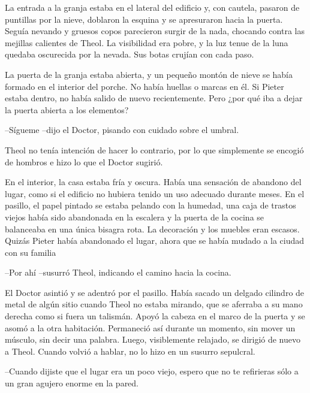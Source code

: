 La entrada a la granja estaba en el lateral del edificio y, con cautela, pasaron de puntillas por la nieve, doblaron la esquina y se apresuraron hacia la puerta. Seguía nevando y gruesos copos parecieron surgir de la nada, chocando contra las mejillas calientes de Theol. La visibilidad era pobre, y la luz tenue de la luna quedaba oscurecida por la nevada. Sus botas crujían con cada paso.



La puerta de la granja estaba abierta, y un pequeño montón de nieve se había formado en el interior del porche. No había huellas o marcas en él. Si Pieter estaba dentro, no había salido de nuevo recientemente. Pero ¿por qué iba a dejar la puerta abierta a los elementos?



--Sígueme --dijo el Doctor, pisando con cuidado sobre el umbral.



Theol no tenía intención de hacer lo contrario, por lo que simplemente se encogió de hombros e hizo lo que el Doctor sugirió.



En el interior, la casa estaba fría y oscura. Había una sensación de abandono del lugar, como si el edificio no hubiera tenido un uso adecuado durante meses. En el pasillo, el papel pintado se estaba pelando con la humedad, una caja de trastos viejos había sido abandonada en la escalera y la puerta de la cocina se balanceaba en una única bisagra rota. La decoración y los muebles eran escasos. Quizás Pieter había abandonado el lugar, ahora que se había mudado a la ciudad con su familia



--Por ahí --susurró Theol, indicando el camino hacia la cocina.



El Doctor asintió y se adentró por el pasillo. Había sacado un delgado cilindro de metal de algún sitio cuando Theol no estaba mirando, que se aferraba a su mano derecha como si fuera un talismán. Apoyó la cabeza en el marco de la puerta y se asomó a la otra habitación. Permaneció así durante un momento, sin mover un músculo, sin decir una palabra. Luego, visiblemente relajado, se dirigió de nuevo a Theol. Cuando volvió a hablar, no lo hizo en un susurro sepulcral.

--Cuando dijiste que el lugar era un poco viejo, espero que no te refirieras sólo a un gran agujero enorme en la pared.



